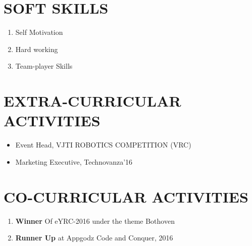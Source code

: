 \documentclass[11pt,a4paper,sans]{moderncv}
\begin{document}
	\section{SOFT SKILLS}
	\begin{enumerate}
		\item {Self Motivation}
		\item {Hard working}
		\item {Team-player Skills}
		
	\end{enumerate}
	\section{EXTRA-CURRICULAR ACTIVITIES}
	\begin{itemize}
		\item {Event Head, VJTI ROBOTICS COMPETITION (VRC)}
		\item {Marketing Executive, Technovanza'16}
	\end{itemize}
	\section{CO-CURRICULAR ACTIVITIES}
	\begin{enumerate}
		\item{\textbf{Winner} Of eYRC-2016 under the theme Bothoven}
		\item{\textbf{Runner Up} at Appgodz Code and Conquer, 2016}
	\end{enumerate}
\end{document}
